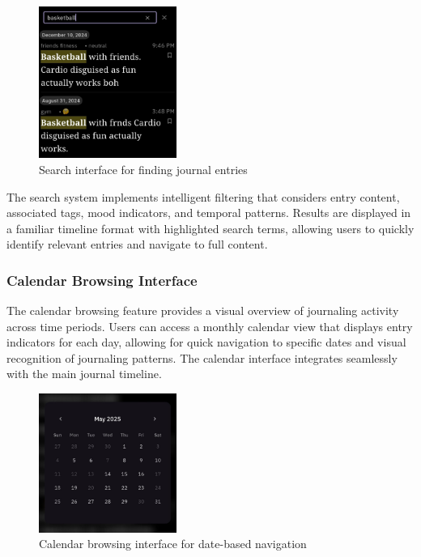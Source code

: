\begin{samepage}
\begin{figure}[H]
\centering
\includegraphics[width=0.4\textwidth]{files/imgs/prototype/search_interface.jpeg}
\caption{Search interface for finding journal entries}
\label{fig:search-interface}
\end{figure}
\end{samepage}

The search system implements intelligent filtering that considers entry content, associated tags, mood indicators, and temporal patterns. Results are displayed in a familiar timeline format with highlighted search terms, allowing users to quickly identify relevant entries and navigate to full content.

\subsubsection{Calendar Browsing Interface}

The calendar browsing feature provides a visual overview of journaling activity across time periods. Users can access a monthly calendar view that displays entry indicators for each day, allowing for quick navigation to specific dates and visual recognition of journaling patterns. The calendar interface integrates seamlessly with the main journal timeline.

\begin{samepage}
\begin{figure}[H]
\centering
\includegraphics[width=0.4\textwidth]{files/imgs/prototype/calendar_browsing.jpeg}
\caption{Calendar browsing interface for date-based navigation}
\label{fig:calendar-browsing}
\end{figure}
\end{samepage}

